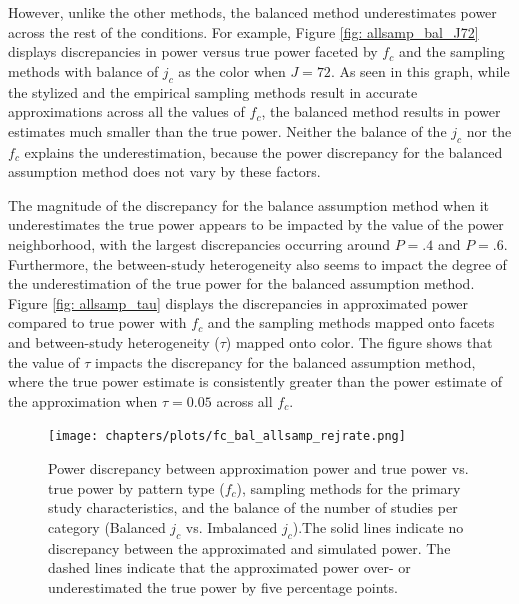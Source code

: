 However, unlike the other methods, the balanced method underestimates power across the rest of the conditions. For example, Figure \ref{fig: allsamp_bal_J72} displays discrepancies in power versus true power faceted by $f_c$ and the sampling methods with balance of $j_c$ as the color when $J=72$. As seen in this graph, while the stylized and the empirical sampling methods result in accurate approximations across all the values of $f_c$, the balanced method results in power estimates much smaller than the true power.  Neither the balance of the $j_c$ nor the $f_c$ explains the underestimation, because the power discrepancy for the balanced assumption method does not vary by these factors. 

The magnitude of the discrepancy for the balance assumption method when it underestimates the true power appears to be impacted by the value of the power neighborhood, with the largest discrepancies occurring around $P = .4$ and $P = .6$. Furthermore, the between-study heterogeneity also seems to impact the degree of the underestimation of the true power for the balanced assumption method. Figure \ref{fig: allsamp_tau} displays the discrepancies in approximated power compared to true power with $f_c$ and the sampling methods mapped onto facets and between-study heterogeneity ($\tau$) mapped onto color. The figure shows that the value of $\tau$ impacts the discrepancy for the balanced assumption method, where the true power estimate is consistently greater than the power estimate of the approximation when $\tau = 0.05$ across all $f_c$.


\begin{figure}
    \centering
    \vspace{-5pt}\texttt{[image: chapters/plots/fc\_bal\_allsamp\_rejrate.png]}\caption{Power discrepancy between approximation power and true power vs. true power by pattern type ($f_c$), sampling methods for the primary study characteristics, and the balance of the number of studies per category (Balanced $j_c$ vs. Imbalanced $j_c$).The solid lines indicate no discrepancy between the approximated and simulated power. The dashed lines indicate that the approximated power over- or underestimated the true power by five percentage points.\label{fig: fc_bal_allsamp_rejrate}}
    \vspace{-5pt}
\end{figure}

